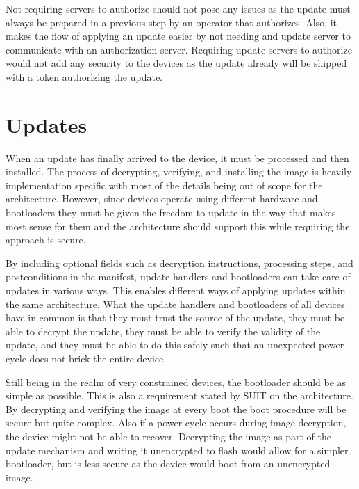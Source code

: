 \documentclass[0-thesis.tex]{subfiles}
\begin{document}
Not requiring servers to authorize should not pose any issues as the update must always be
prepared in a previous step by an operator that authorizes. Also, it makes the flow of
applying an update easier by not needing and update server to communicate with an
authorization server. Requiring update servers to authorize would not add any security to
the devices as the update already will be shipped with a token authorizing the update.

\section{Updates}
\label{sec:updates}
When an update has finally arrived to the device, it must be processed and then installed.
The process of decrypting, verifying, and installing the image is heavily implementation
specific with most of the details being out of scope for the architecture. However, since
devices operate using different hardware and bootloaders they must be given the freedom to
update in the way that makes most sense for them and the architecture should support this
while requiring the approach is secure.

By including optional fields such as decryption instructions, processing steps, and
postconditions in the manifest, update handlers and bootloaders can take care of updates
in various ways. This enables different ways of applying updates within the same
architecture. What the update handlers and bootloaders of all devices have in common is
that they must trust the source of the update, they must be able to decrypt the update,
they must be able to verify the validity of the update, and they must be able to do this
safely such that an unexpected power cycle does not brick the entire device.

Still being in the realm of very constrained devices, the bootloader should be as simple
as possible. This is also a requirement stated by SUIT on the architecture. By decrypting
and verifying the image at every boot the boot procedure will be secure but quite complex.
Also if a power cycle occurs during image decryption, the device might not be able to
recover. Decrypting the image as part of the update mechanism and writing it unencrypted
to flash would allow for a simpler bootloader, but is less secure as the device would boot
from an unencrypted image.
\end{document}
